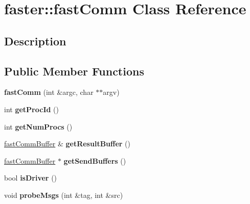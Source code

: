 \hypertarget{classfaster_1_1fastComm}{}\section{faster\+:\+:fast\+Comm Class Reference}
\label{classfaster_1_1fastComm}


\subsection{Description}
\subsection*{Public Member Functions}
\begin{DoxyCompactItemize}
\item 
\hypertarget{classfaster_1_1fastComm_a2783608e26ab9d7afb185a3c27cdc8cf}{}\label{classfaster_1_1fastComm_a2783608e26ab9d7afb185a3c27cdc8cf} 
{\bfseries fast\+Comm} (int \&argc, char $\ast$$\ast$argv)
\item 
\hypertarget{classfaster_1_1fastComm_abc2ab1663dab2076556a165b2b709400}{}\label{classfaster_1_1fastComm_abc2ab1663dab2076556a165b2b709400} 
int {\bfseries get\+Proc\+Id} ()
\item 
\hypertarget{classfaster_1_1fastComm_adb5362e1b299df2bc3753dea326f603d}{}\label{classfaster_1_1fastComm_adb5362e1b299df2bc3753dea326f603d} 
int {\bfseries get\+Num\+Procs} ()
\item 
\hypertarget{classfaster_1_1fastComm_a8f53072a54ba41fa2854dd829312f1c9}{}\label{classfaster_1_1fastComm_a8f53072a54ba41fa2854dd829312f1c9} 
\hyperlink{classfaster_1_1fastCommBuffer}{fast\+Comm\+Buffer} \& {\bfseries get\+Result\+Buffer} ()
\item 
\hypertarget{classfaster_1_1fastComm_acd4b18c158437d46b8bfa5e6b1077d29}{}\label{classfaster_1_1fastComm_acd4b18c158437d46b8bfa5e6b1077d29} 
\hyperlink{classfaster_1_1fastCommBuffer}{fast\+Comm\+Buffer} $\ast$ {\bfseries get\+Send\+Buffers} ()
\item 
\hypertarget{classfaster_1_1fastComm_afab41f8b143b49d41150707b1665f33a}{}\label{classfaster_1_1fastComm_afab41f8b143b49d41150707b1665f33a} 
bool {\bfseries is\+Driver} ()
\item 
\hypertarget{classfaster_1_1fastComm_ae4989c905340be092381e00f2166d9bc}{}\label{classfaster_1_1fastComm_ae4989c905340be092381e00f2166d9bc} 
void {\bfseries probe\+Msgs} (int \&tag, int \&src)
\item 
\hypertarget{classfaster_1_1fastComm_a5a539bee13feec7bcb48d2aca3811bff}{}\label{classfaster_1_1fastComm_a5a539bee13feec7bcb48d2aca3811bff} 
$$
\end{DoxyCompactItemize}
